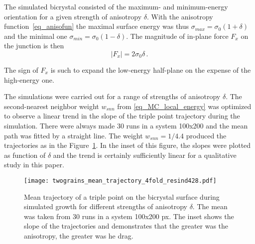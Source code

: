 The simulated bicrystal consisted of the maximum- and minimum-energy orientation for a given strength of anisotropy $\delta$. With the anisotropy function~\eqref{eq_anisofun} the maximal surface energy was thus $\sigma_{max}=\sigma_0(1+\delta)$ and the minimal one $\sigma_{min}=\sigma_0(1-\delta)$. The magnitude of in-plane force $F_x$ on the junction is then 
\begin{equation}
	|F_x| = 2\sigma_0\delta \,.
\end{equation}

The sign of $F_x$ is such to expand the low-energy half-plane on the expense of the high-energy one.

The simulations were carried out for a range of strengths of anisotropy $\delta$. The second-nearest neighbor weight $w_{snn}$ from \eqref{eq_MC_local_energy} was optimized to observe a linear trend in the slope of the triple point trajectory during the simulation. There were always made 30 runs in a system 100x200 and the mean path was fitted by a straight line. The weight $w_{snn}=1/4.4$ produced the trajectories as in the Figure~\ref{fig_MC_bicrystal_validation}. In the inset of this figure, the slopes were plotted as function of $\delta$ and the trend is certainly sufficiently linear for a qualitative study in this paper.

\begin{figure}
	\centering
	\texttt{[image: twograins\_mean\_trajectory\_4fold\_resind428.pdf]}
	\caption{Mean trajectory of a triple point on the bicrystal surface during simulated growth for different strengths of anisotropy $\delta$. The mean was taken from 30 runs in a system 100x200 px. The inset shows the slope of the trajectories and demonstrates that the greater was the anisotropy, the greater was he drag.}
	\label{fig_MC_bicrystal_validation}
\end{figure}

